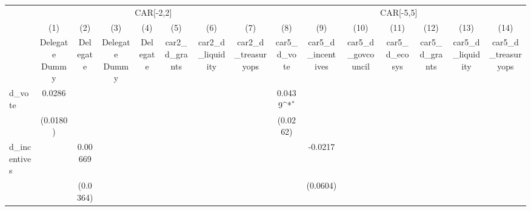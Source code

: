 {
\def\sym#1{\ifmmode^{#1}\else\(^{#1}\)\fi}
\begin{tabular}{l*{14}{c}}
\hline\hline
                    &\multicolumn{7}{c}{CAR[-2,2]}                                                                                                                            &\multicolumn{7}{c}{CAR[-5,5]}                                                                                                                            \\
                    &\multicolumn{1}{c}{(1)}&\multicolumn{1}{c}{(2)}&\multicolumn{1}{c}{(3)}&\multicolumn{1}{c}{(4)}&\multicolumn{1}{c}{(5)}&\multicolumn{1}{c}{(6)}&\multicolumn{1}{c}{(7)}&\multicolumn{1}{c}{(8)}&\multicolumn{1}{c}{(9)}&\multicolumn{1}{c}{(10)}&\multicolumn{1}{c}{(11)}&\multicolumn{1}{c}{(12)}&\multicolumn{1}{c}{(13)}&\multicolumn{1}{c}{(14)}\\
                    &\multicolumn{1}{c}{Delegate Dummy}&\multicolumn{1}{c}{Delegate}&\multicolumn{1}{c}{Delegate Dummy}&\multicolumn{1}{c}{Delegate}&\multicolumn{1}{c}{car2\_d\_grants}&\multicolumn{1}{c}{car2\_d\_liquidity}&\multicolumn{1}{c}{car2\_d\_treasuryops}&\multicolumn{1}{c}{car5\_d\_vote}&\multicolumn{1}{c}{car5\_d\_incentives}&\multicolumn{1}{c}{car5\_d\_govcouncil}&\multicolumn{1}{c}{car5\_d\_ecosys}&\multicolumn{1}{c}{car5\_d\_grants}&\multicolumn{1}{c}{car5\_d\_liquidity}&\multicolumn{1}{c}{car5\_d\_treasuryops}\\
\hline
d\_vote              &      0.0286         &                     &                     &                     &                     &                     &                     &      0.0439\sym{*}  &                     &                     &                     &                     &                     &                     \\
                    &    (0.0180)         &                     &                     &                     &                     &                     &                     &    (0.0262)         &                     &                     &                     &                     &                     &                     \\
d\_incentives        &                     &     0.00669         &                     &                     &                     &                     &                     &                     &     -0.0217         &                     &                     &                     &                     &                     \\
                    &                     &    (0.0364)         &                     &                     &                     &                     &                     &                     &    (0.0604)         &                     &                     &                     &                     &                     \\

\end{tabular}}

